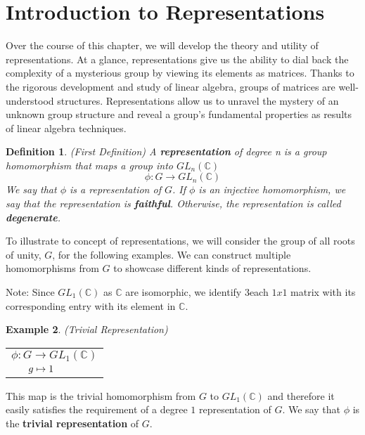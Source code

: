 \documentclass[10pt]{ucthesis}
\newtheorem{definition}{Definition}[chapter]
\newtheorem{example}[definition]{Example}
\begin{document}
\section{Introduction to Representations}

Over the course of this chapter, we will develop the theory and utility of representations. At a glance, representations give us the ability to dial back the complexity of a mysterious group by viewing its elements as matrices. Thanks to the rigorous development and study of linear algebra, groups of matrices are well-understood structures. Representations allow us to unravel the mystery of an unknown group structure and reveal a group's fundamental properties as results of linear algebra techniques. 

\begin{definition}
	(First Definition) A \textbf{representation} of degree n is a group homomorphism that maps a group into $GL_n(\mathbb{C})$
	$$\phi:G\rightarrow GL_n(\mathbb{C})$$
	We say that $\phi$ is a representation of $G$. If $\phi$ is an injective homomorphism, we say that the representation is \textbf{faithful}. Otherwise, the representation is called \textbf{degenerate}.
\end{definition}

To illustrate to concept of representations, we will consider the group of all roots of unity, $G$, for the following examples. We can construct multiple homomorphisms from $G$ to showcase different kinds of representations. 

\noindent Note: Since $GL_1(\mathbb{C})$ as $\mathbb{C}$ are isomorphic, we identify 3each $1x1$ matrix with its corresponding entry with its element in $\mathbb{C}$.

\begin{example}
	(Trivial Representation)
	\renewcommand{\arraystretch}{0.7}
		\begin{tabular}{l}$\phi:G\rightarrow GL_1(\mathbb{C})$\\
		$\hspace{6mm}g\mapsto 1$
		\end{tabular}
\end{example}

	

\noindent This map is the trivial homomorphism from $G$ to $GL_1(\mathbb{C})$ and therefore it easily satisfies the requirement of a degree $1$ representation of $G$. We say that $\phi$ is the \textbf{trivial representation} of $G$.

	
\end{document}
